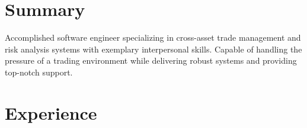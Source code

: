 \documentclass[11pt,a4paper,sans]{moderncv}
\begin{document}
\makecvtitle

\section{Summary}
Accomplished software engineer specializing in cross-asset trade management and risk analysis systems with exemplary interpersonal skills. Capable of handling the pressure of a trading environment while delivering robust systems and providing top-notch support.

\section{Experience}

\end{document}
